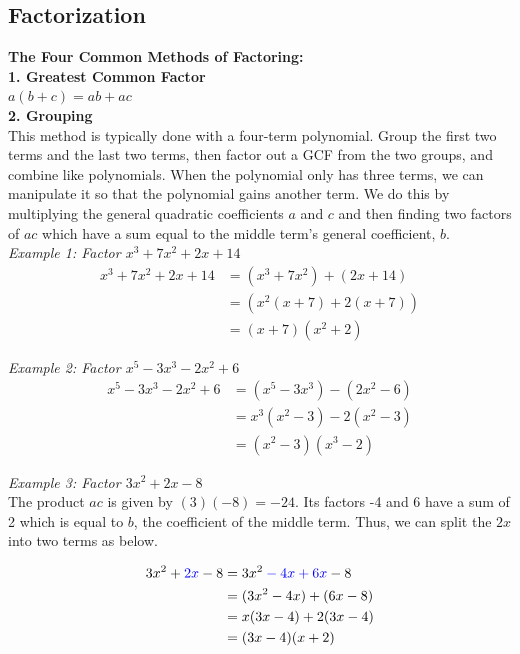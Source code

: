     \subsection{Factorization}
        \textbf{The Four Common Methods of Factoring:} \\
        \color{purple} \textbf{1. Greatest Common Factor} \color{black} \\
        $a(b+c)=ab+ac$ \\
        \color{purple} \textbf{2. Grouping} \color{black} \\
        This method is typically done with a four-term polynomial. Group the first two terms
        and the last two terms, then factor out a GCF from the two groups, and combine like
        polynomials. When the polynomial only has three terms, we can manipulate it so that the
        polynomial gains another term. We do this by multiplying the general quadratic
        coefficients $a$ and $c$ and then finding two factors of $ac$ which have a sum equal to
        the middle term's general coefficient, $b$. \\

        \noindent \color{blue} \textit{Example 1: Factor $x^3+7x^2+2x+14$} \color{black} \\
        \begin{align*}
            x^3+7x^2+2x+14 &= (x^3+7x^2) + (2x+14) \\
            &= (x^2(x+7) + 2(x+7)) \\
            &= (x+7)(x^2+2)
        \end{align*}

        \noindent \color{blue} \textit{Example 2: Factor $x^5-3x^3-2x^2+6$} \color{black} \\
        \begin{align*}
            x^5-3x^3-2x^2+6 &= (x^5-3x^3) - (2x^2-6) \\
            &= x^3(x^2-3) - 2(x^2-3) \\
            &= (x^2-3)(x^3-2)
        \end{align*}

        \noindent \color{blue} \textit{Example 3: Factor $3x^2+2x-8$} \color{black} \\
        The product $ac$ is given by $(3)(-8) = -24$. Its factors -4 and 6 have a sum of 2
        which is equal to $b$, the coefficient of the middle term. Thus, we can split the $2x$
        into two terms as below.

        \begin{align*}
            3x^2+\color{blue}2x\color{black}-8 &= 3x^2\color{blue}-4x+6x\color{black}-8 \\
            &= (3x^2-4x) + (6x-8) \\
            &= x(3x-4) + 2(3x-4) \\
            &= (3x-4)(x+2)
        \end{align*}

